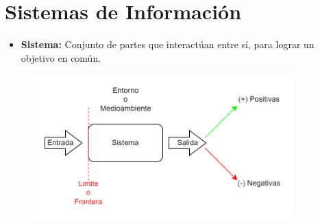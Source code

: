 \documentclass{templateNote}
\begin{document}

\portada
\margenes

\tableofcontents

\newpage
\section{Sistemas de Información}
\begin{itemize}
    \item \textbf{Sistema:} Conjunto de partes que interactúan entre sí, para lograr un objetivo en común.
\end{itemize}
\begin{figure}[H]
    \centering
    \includegraphics[width=0.9\textwidth]{img/diagrama Sistema.png}
\end{figure}
\end{document}
